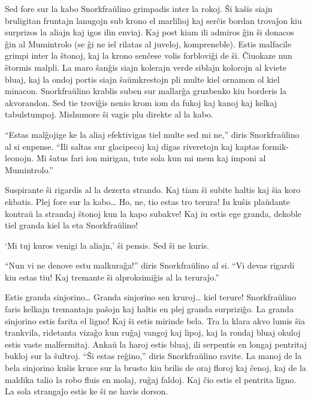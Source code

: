 Sed fore sur la kabo Snorkfraŭlino grimpadis inter la rokoj. Ŝi kaŝis siajn bruligitan fruntajn lanugojn sub krono el marlilioj kaj serĉis bordan trovaĵon kiu surprizos la aliajn kaj igos ilin enviaj. Kaj post kiam ili admiros ĝin ŝi donacos ĝin al Mumintrolo (se ĝi ne iel rilatas al juveloj, kompreneble). Estis malfacile grimpi inter la ŝtonoj, kaj la krono senĉese volis forbloviĝi de ŝi. Ĉiuokaze nun ŝtormis malpli. La maro ŝanĝis siajn kolerajn verde siblajn kolorojn al kviete bluaj, kaj la ondoj portis siajn ŝaŭmkrestojn pli multe kiel ornamon ol kiel minacon. Snorkfraŭlino krablis suben sur mallarĝa gruzbenko kiu borderis la akvorandon. Sed tie troviĝis nenio krom iom da fukoj kaj kanoj kaj kelkaj tabulstumpoj. Mishumore ŝi vagis plu direkte al la kabo.

``Estas malĝojige ke la aliaj efektivigas tiel multe sed mi ne,'' diris Snorkfraŭlino al si enpense. ``Ili saltas sur glacipecoj kaj digas riveretojn kaj kaptas formik-leonojn. Mi ŝatus fari ion mirigan, tute sola kun mi mem kaj imponi al Mumintrolo.''

Suspirante ŝi rigardis al la dezerta strando. Kaj tiam ŝi subite haltis kaj ŝia koro ekbatis. Plej fore sur la kabo{\ldots} Ho, ne, tio estas tro terura! Iu kuŝis plaŭdante kontraŭ la strandaj ŝtonoj kun la kapo subakve! Kaj iu estis ege granda, dekoble tiel granda kiel la eta Snorkfraŭlino!

`Mi tuj kuros venigi la aliajn,' ŝi pensis. Sed ŝi ne kuris.

``Nun vi ne denove estu malkuraĝa!'' diris Snorkfraŭlino al si. ``Vi devas rigardi kiu estas tiu! Kaj tremante ŝi alproksimiĝis al la teruraĵo.''

Estis granda sinjorino{\ldots} Granda sinjorino sen kruroj{\ldots} kiel terure! Snorkfraŭlino faris kelkajn tremantajn paŝojn kaj haltis en plej granda surpriziĝo. La granda sinjorino estis farita el ligno! Kaj ŝi estis mirinde bela. Tra la klara akvo lumis ŝia trankvila, ridetanta vizaĝo kun ruĝaj vangoj kaj lipoj, kaj la rondaj bluaj okuloj estis vaste malfermitaj. Ankaŭ la haroj estis bluaj, ili serpentis en longaj pentritaj bukloj sur la ŝultroj. ``Ŝi estas reĝino,'' diris Snorkfraŭlino ravite. La manoj de la bela sinjorino kuŝis kruce sur la brusto kiu brilis de oraj floroj kaj ĉenoj, kaj de la maldika talio la robo fluis en molaj, ruĝaj faldoj. Kaj ĉio estis el pentrita ligno. La sola strangaĵo estis ke ŝi ne havis dorson.

